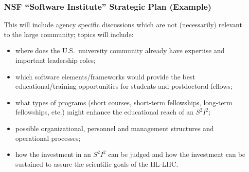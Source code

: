 \begin{frame}
\frametitle{NSF ``Software Institute'' Strategic Plan (Example)} 

This will include agency specific discussions which are not (necessarily) 
relevant to the large community; topics will include:
 \begin{itemize}
   \item
     where does the U.S.\ university community already have
     expertise and important leadership roles;
   \item
     which software elements/frameworks would provide
     the best educational/training opportunities
     for students and postdoctoral fellows;
   \item
     what  types of programs (short courses, short-term
     fellowships, long-term fellowships, etc.)
     might enhance the educational
     reach of an $ S^2 I^2 $;
   \item
     possible organizational, personnel and management
     structures and operational processes;
    \item
     how the investment in an $ S^2 I^2 $ can be judged
     and how the investment can be sustained
     to assure the scientific goals of the HL-LHC.
 \end{itemize}

\end{frame}



